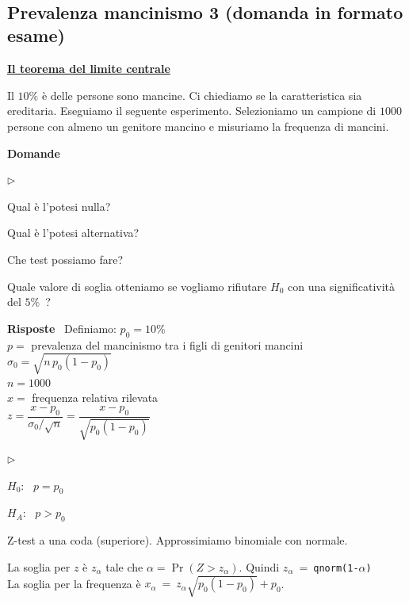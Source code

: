 \documentclass[11pt,openany]{book}
\newcommand{\mylabel}[1]{{\footnotesize\textsf{#1}}\hfill}
\renewenvironment{itemize}
  {\begin{list}{$\triangleright$}{%
   \setlength{\parskip}{0mm}
   \setlength{\topsep}{.2\baselineskip}
   \setlength{\rightmargin}{0mm}
   \setlength{\listparindent}{0mm}
   \setlength{\itemindent}{0mm}
   \setlength{\labelwidth}{3ex}
   \setlength{\itemsep}{.4\baselineskip}
   \setlength{\parsep}{0mm}
   \setlength{\partopsep}{0mm}
   \setlength{\labelsep}{1ex}
   \setlength{\leftmargin}{\labelwidth+\labelsep}
   \let\makelabel\mylabel}}{%
   \end{list}\vspace*{-1.3mm}}
\begin{document}
\hfill{}\clearpage\
\subsection{Prevalenza mancinismo 3 (domanda in formato esame)}
\label{mancini3}
\hfill\textbf{{\color{brown}\hyperref[CLT]{Il teorema del limite centrale \faShare}}}

Il $10\%$ è delle persone sono mancine. Ci chiediamo se la caratteristica sia ereditaria. Eseguiamo il seguente esperimento. Selezioniamo un campione di $1000$ persone con almeno un genitore mancino e misuriamo la frequenza di mancini.

\textbf{Domande}

\begin{itemize}
\item[1.] Qual è l'potesi nulla?

\item[2.] Qual è l'potesi alternativa?

\item[3.] Che test possiamo fare?

\item[4.] Quale valore di soglia otteniamo se vogliamo rifiutare $H_0$ con una significatività del $5\%$~?
\end{itemize}

\textbf{Risposte} \ Definiamo: 
$p_0=10\%$\\
$p=$  prevalenza del mancinismo tra i figli di genitori mancini\\
$\sigma_0=\sqrt{n\, p_0(1-p_0)}$\\
$n=1000$\\
$x = $ frequenza relativa rilevata\\
$z=\dfrac{x - p_0}{\sigma_0/\sqrt{n}}=\dfrac{x - p_0}{\sqrt{p_0(1-p_0)}}$\\

\begin{itemize}
\item[1.] $H_0$: \ $p=p_0$ 
\item[2.] $H_A$: \ $p>p_0$ 
\item[3.] Z-test a una coda (superiore). Approssimiamo binomiale con normale.
\item[4.] La soglia per $z$ è $z_\alpha$ tale che $\alpha=\Pr(Z>z_\alpha)$. Quindi $z_\alpha\ =\ ${\tt qnorm(1-$\alpha$)}\\
La soglia per la frequenza è $x_\alpha\ =\ z_\alpha\sqrt{p_0(1-p_0)} +p_0$.
\end{itemize}
\end{document}
